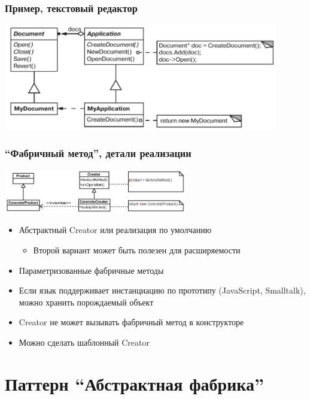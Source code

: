 \documentclass[xetex,mathserif,serif]{beamer}
\begin{document}
	\begin{frame}
		\frametitle{Пример, текстовый редактор}
		\begin{center}
			\includegraphics[width=0.9\textwidth]{factoryMethodForTextEditor.png}
		\end{center}
	\end{frame}

	\begin{frame}
		\frametitle{``Фабричный метод'', детали реализации}
		\begin{center}
			\includegraphics[width=0.6\textwidth]{factoryMethod.png}
		\end{center}
		\begin{itemize}
			\item Абстрактный Creator или реализация по умолчанию
			\begin{itemize}
				\item Второй вариант может быть полезен для расширяемости
			\end{itemize}
			\item Параметризованные фабричные методы
			\item Если язык поддерживает инстанциацию по прототипу (JavaScript, Smalltalk), можно хранить порождаемый объект
			\item Creator не может вызывать фабричный метод в конструкторе
			\item Можно сделать шаблонный Creator
		\end{itemize}
	\end{frame}

	\section{Паттерн ``Абстрактная фабрика''}
\end{document}
